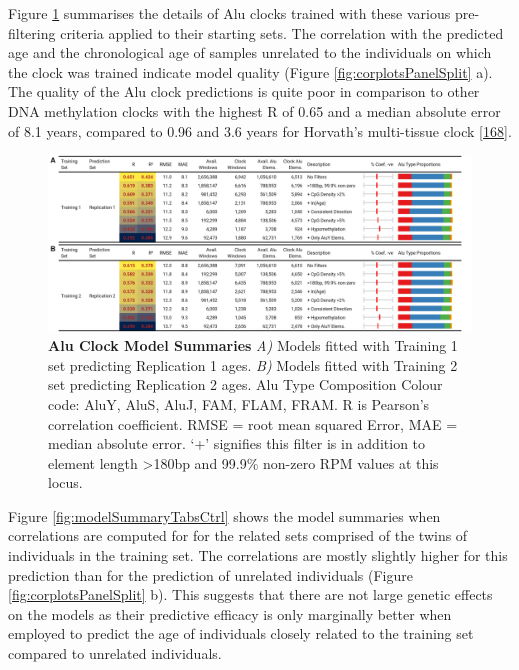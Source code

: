 \documentclass[
]{book}
\begin{document}
Figure \ref{fig:modelSummaryTabsMain} summarises the details of Alu clocks trained with these various pre-filtering criteria applied to their starting sets.
The correlation with the predicted age and the chronological age of samples unrelated to the individuals on which the clock was trained indicate model quality (Figure \ref{fig:corplotsPanelSplit} a).
The quality of the Alu clock predictions is quite poor in comparison to other DNA methylation clocks with the highest R of 0.65 and a median absolute error of 8.1 years, compared to 0.96 and 3.6 years for Horvath's multi-tissue clock {[}\protect\hyperlink{ref-Horvath2013}{168}{]}.

\begin{figure}

{\centering \includegraphics[width=1\linewidth]{./figs/model_summary_tabs_main} 

}

\caption{\textbf{Alu Clock Model Summaries} \emph{A)} Models fitted with Training 1 set predicting Replication 1 ages. \emph{B)} Models fitted with Training 2 set predicting Replication 2 ages. Alu Type Composition Colour code: \textcolor[HTML]{e41a1c}{AluY}, \textcolor[HTML]{377eb8}{AluS}, \textcolor[HTML]{4daf4a}{AluJ}, \textcolor[HTML]{984ea3}{FAM}, \textcolor[HTML]{ff7f00}{FLAM}, \textcolor[HTML]{ffff33}{FRAM}. R is Pearson's correlation coefficient. RMSE = root mean squared Error, MAE = median absolute error. `+' signifies this filter is in addition to element length \textgreater180bp and 99.9\% non-zero RPM values at this locus.}\label{fig:modelSummaryTabsMain}
\end{figure}



Figure \ref{fig:modelSummaryTabsCtrl} shows the model summaries when correlations are computed for for the related sets comprised of the twins of individuals in the training set.
The correlations are mostly slightly higher for this prediction than for the prediction of unrelated individuals (Figure \ref{fig:corplotsPanelSplit} b).
This suggests that there are not large genetic effects on the models as their predictive efficacy is only marginally better when employed to predict the age of individuals closely related to the training set compared to unrelated individuals.
\end{document}

